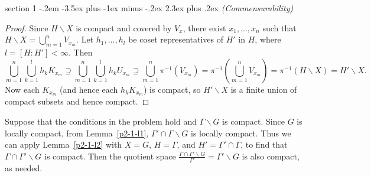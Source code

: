\documentclass[12pt]{article}
\makeatletter
\theoremstyle{norm}
\newcommand{\subeq}[0]{\subseteq}
\newcommand{\supeq}[0]{\supseteq}
\newcommand{\Ga}[0]{\Gamma}
\newcommand{\pa}[1]{\left( {#1} \right)}
\newcommand{\bs}[0]{\backslash}
\newenvironment{problem}{\@startsection
       {section}
       {1}
       {-.2em}
       {-3.5ex plus -1ex minus -.2ex}
       {2.3ex plus .2ex}
       {\pagebreak[3]%
       \large\bf\noindent{Problem }
       }
       }
       {%
       }
\makeatother
\begin{document}
\begin{problem}{\it (Commensurability)}
\begin{proof}
Since $H\bs X$ is compact and covered by $V_x$, there exist $x_1,\ldots, x_n$ such that $H\bs X=\bigcup_{m=1}^n V_{x_m}$. 
Let $h_1,\ldots, h_l$ be coset representatives of $H'$ in $H$, where $l=[H:H']<\infty$. Then
\[
\bigcup_{m=1}^n
\bigcup_{k=1}^l
 h_kK_{x_m}\supeq 
\bigcup_{m=1}^n
\bigcup_{k=1}^l
 h_kU_{x_m}\supeq
\bigcup_{m=1}^n 
\pi^{-1}(V_{x_m})
= \pi^{-1}\pa{\bigcup_{m=1}^n V_{x_m}}
=\pi^{-1}(H\bs X)
=H'\bs X.
\]
Now each $K_{x_m}$ (and hence each $h_kK_{x_m}$) is compact, so $H'\bs X$ is a finite union of compact subsets and hence compact.
\end{proof}
Suppose that the conditions in the problem hold and $\Ga\bs G$ is compact.
Since $G$ is locally compact, from Lemma~\ref{p2-1-l1}, $\Ga'\cap \Ga\bs G$ is locally compact.
Thus we can apply Lemma~\ref{p2-1-l2} with $X=G$, $H=\Ga$, and $H'=\Ga'\cap \Ga$, to find that $\Ga\cap \Ga'\bs G$ is compact.
Then the quotient space $\frac{\Ga\cap\Ga' \bs G}{\Ga'}=\Ga'\bs G$ is also compact, as needed. %


\end{problem}
\end{document}

